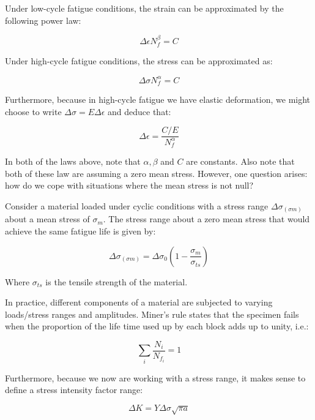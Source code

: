 \documentclass{article}
\begin{document}
\begin{theorem}
    Under low-cycle fatigue conditions, the strain can be approximated by the following power law:

    \[ \Delta\epsilon N_f^\beta = C \]
\end{theorem}

\begin{theorem}
    Under high-cycle fatigue conditions, the stress can be approximated as:

    \[ \Delta\sigma N_f^\alpha = C \]

    Furthermore, because in high-cycle fatigue we have elastic deformation, we might choose to write $\Delta\sigma = E\Delta\epsilon$ and deduce that:

    \[ \Delta\epsilon = \frac{C/E}{N_f^\alpha} \]
\end{theorem}

In both of the laws above, note that $\alpha, \beta$ and $C$ are constants. Also note that both of these law are assuming a zero mean stress. However, one question arises: how do we cope with situations where the mean stress is not null?

\begin{theorem}
    Consider a material loaded under cyclic conditions with a stress range $\Delta\sigma_{(\sigma m)}$ about a mean stress of $\sigma_m$. The stress range about a zero mean stress that would achieve the same fatigue life is given by:

    \[ \Delta\sigma_{(\sigma m)} = \Delta\sigma_0\left(1 - \frac{\sigma_m}{\sigma_{ts}}\right) \]

    Where $\sigma_{ts}$ is the tensile strength of the material.
\end{theorem}

\begin{theorem}
    In practice, different components of a material are subjected to varying loads/stress ranges and amplitudes. Miner's rule states that the specimen fails when the proportion of the life time used up by each block adds up to unity, i.e.:

    \[ \sum_i \frac{N_i}{N_{f_i}} = 1 \]
\end{theorem}

Furthermore, because we now are working with a stress range, it makes sense to define a stress intensity factor range:

\[ \Delta K = Y\Delta\sigma\sqrt{\pi a} \]
\end{document}
